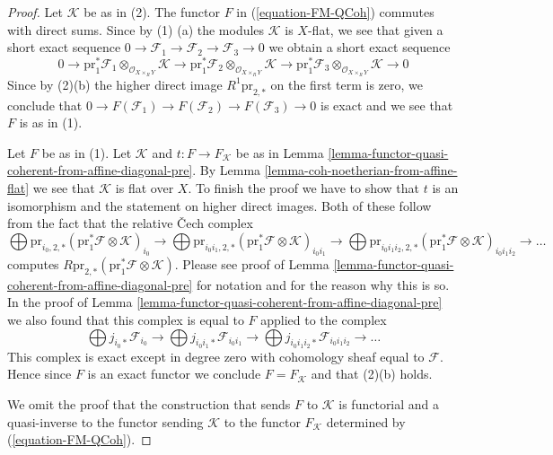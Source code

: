 \documentclass{stacks-project}
\theoremstyle{plain}
\theoremstyle{definition}
\theoremstyle{remark}
\numberwithin{equation}{subsection}
\begin{document}
\begin{proof}
Let $\mathcal{K}$ be as in (2). The functor $F$ in
(\ref{equation-FM-QCoh}) commutes with direct sums.
Since by (1) (a) the modules $\mathcal{K}$ is $X$-flat,
we see that given a short exact
sequence $0 \to \mathcal{F}_1 \to \mathcal{F}_2 \to \mathcal{F}_3 \to 0$
we obtain a short exact sequence
$$
0 \to
\text{pr}_1^*\mathcal{F}_1 \otimes_{\mathcal{O}_{X \times_R Y}} \mathcal{K} \to
\text{pr}_1^*\mathcal{F}_2 \otimes_{\mathcal{O}_{X \times_R Y}} \mathcal{K} \to
\text{pr}_1^*\mathcal{F}_3 \otimes_{\mathcal{O}_{X \times_R Y}} \mathcal{K} \to
0
$$
Since by (2)(b) the higher direct image $R^1\text{pr}_{2, *}$
on the first term is zero, we conclude that
$0 \to F(\mathcal{F}_1) \to F(\mathcal{F}_2) \to F(\mathcal{F}_3) \to 0$
is exact and we see that $F$ is as in (1).

\medskip\noindent
Let $F$ be as in (1). Let $\mathcal{K}$ and $t : F \to F_\mathcal{K}$ be as
in Lemma \ref{lemma-functor-quasi-coherent-from-affine-diagonal-pre}.
By Lemma \ref{lemma-coh-noetherian-from-affine-flat} we see
that $\mathcal{K}$ is flat over $X$. To finish the proof we have
to show that $t$ is an isomorphism and the statement on higher
direct images. Both of these follow from the fact that the
relative {\v C}ech complex
$$
\bigoplus 
\text{pr}_{i_0, 2, *}
(\text{pr}_1^*\mathcal{F} \otimes \mathcal{K})_{i_0}
\to
\bigoplus 
\text{pr}_{i_0i_1, 2, *}
(\text{pr}_1^*\mathcal{F} \otimes \mathcal{K})_{i_0i_1}
\to
\bigoplus 
\text{pr}_{i_0i_1i_2, 2, *}
(\text{pr}_1^*\mathcal{F} \otimes \mathcal{K})_{i_0i_1i_2}
\to \ldots
$$
computes $R\text{pr}_{2, *}(\text{pr}_1^*\mathcal{F} \otimes \mathcal{K})$.
Please see proof of
Lemma \ref{lemma-functor-quasi-coherent-from-affine-diagonal-pre}
for notation and for the reason why this is so. In the proof of
Lemma \ref{lemma-functor-quasi-coherent-from-affine-diagonal-pre}
we also found that this complex is equal to $F$ applied to the complex
$$
\bigoplus j_{i_0*}\mathcal{F}_{i_0} \to
\bigoplus j_{i_0i_1*}\mathcal{F}_{i_0i_1} \to
\bigoplus j_{i_0i_1i_2*}\mathcal{F}_{i_0i_1i_2} \to \ldots
$$
This complex is exact except in degree zero with cohomology
sheaf equal to $\mathcal{F}$. Hence since $F$ is an exact functor
we conclude $F = F_\mathcal{K}$ and that (2)(b) holds.

\medskip\noindent
We omit the proof that the construction that sends $F$ to
$\mathcal{K}$ is functorial and a quasi-inverse to the
functor sending $\mathcal{K}$ to the functor $F_\mathcal{K}$
determined by (\ref{equation-FM-QCoh}).
\end{proof}
\end{document}
